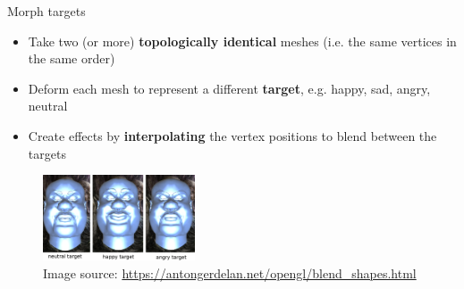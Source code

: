 \begin{frame}{Morph targets}
	\begin{itemize}
		\pause\item Take two (or more) \textbf{topologically identical} meshes (i.e. the same vertices in the same order)
		\pause\item Deform each mesh to represent a different \textbf{target}, e.g. happy, sad, angry, neutral
		\pause\item Create effects by \textbf{interpolating} the vertex positions to blend between the targets
	\end{itemize}
	\begin{figure}[h!]
		\pause\includegraphics[width=0.4\textwidth]{morph_targets}
		\caption*{Image source: \url{https://antongerdelan.net/opengl/blend_shapes.html}}
	\end{figure}
\end{frame}
